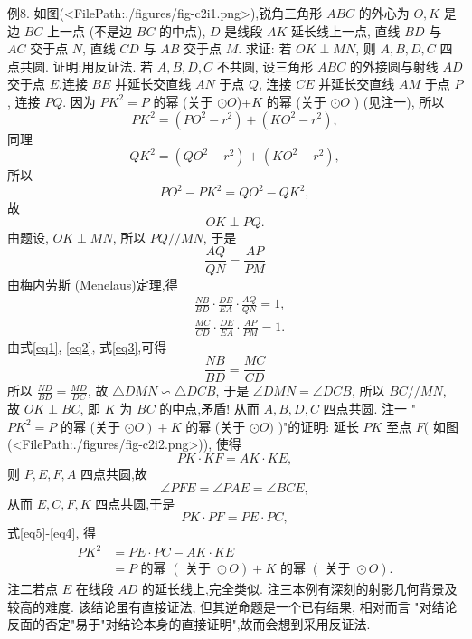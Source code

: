 例8. 如图(<FilePath:./figures/fig-c2i1.png>),锐角三角形 $A B C$ 的外心为 $O, K$ 是边 $B C$ 上一点 (不是边 $B C$ 的中点), $D$ 是线段 $A K$ 延长线上一点, 直线 $B D$ 与 $A C$ 交于点 $N$, 直线 $C D$ 与 $A B$ 交于点 $M$. 
求证: 若 $O K \perp M N$, 则 $A, B, D, C$ 四点共圆.
证明:用反证法.
若 $A, B, D, C$ 不共圆, 设三角形 $A B C$ 的外接圆与射线 $A D$ 交于点 $E$,连接 $B E$ 并延长交直线 $A N$ 于点 $Q$, 连接 $C E$ 并延长交直线 $A M$ 于点 $P$, 连接 $P Q$.
因为 $P K^2=P$ 的幂 (关于 $\odot O$)+$K$ 的幂 (关于 $\odot O$ ) (见注一), 所以
$$
P K^2=\left(P O^2-r^2\right)+\left(K O^2-r^2\right),
$$
同理
$$
Q K^2=\left(Q O^2-r^2\right)+\left(K O^2-r^2\right),
$$
所以
$$
P O^2-P K^2=Q O^2-Q K^2,
$$
故
$$
O K \perp P Q .
$$
由题设, $O K \perp M N$, 所以 $P Q / / M N$, 于是
$$
\frac{A Q}{Q N}=\frac{A P}{P M} \label{eq1}
$$
由梅内劳斯 (Menelaus)定理,得
$$
\begin{aligned}
& \frac{N B}{B D} \cdot \frac{D E}{E A} \cdot \frac{A Q}{Q N}=1, \label{eq2} \\
& \frac{M C}{C D} \cdot \frac{D E}{E A} \cdot \frac{A P}{P M}=1 . \label{eq3}
\end{aligned}
$$
由式\ref{eq1}, \ref{eq2}, 式\ref{eq3},可得
$$
\frac{N B}{B D}=\frac{M C}{C D}
$$
所以 $\frac{N D}{B D}=\frac{M D}{D C}$, 故 $\triangle D M N \backsim \triangle D C B$, 于是 $\angle D M N=\angle D C B$, 所以 $B C / / M N$, 故 $O K \perp B C$, 即 $K$ 为 $B C$ 的中点,矛盾! 从而 $A, B, D, C$ 四点共圆.
注一 " $P K^2=P$ 的幂 (关于 $\left.\odot O\right)+K$ 的幂 (关于 $\odot O)$ )"的证明: 延长 $P K$ 至点 $F$( 如图(<FilePath:./figures/fig-c2i2.png>)), 使得
$$
P K \cdot K F=A K \cdot K E, \label{eq4}
$$
则 $P, E, F, A$ 四点共圆,故
$$
\angle P F E=\angle P A E=\angle B C E,
$$
从而 $E, C, F, K$ 四点共圆,于是
$$
P K \cdot P F=P E \cdot P C, \label{eq5}
$$
式\ref{eq5}-\ref{eq4}, 得
$$
\begin{aligned}
P K^2 & =P E \cdot P C-A K \cdot K E \\
& =P \text { 的幂 }(\text { 关于 } \odot O)+K \text { 的幂 }(\text { 关于 } \odot O) .
\end{aligned}
$$
注二若点 $E$ 在线段 $A D$ 的延长线上,完全类似.
注三本例有深刻的射影几何背景及较高的难度.
该结论虽有直接证法, 但其逆命题是一个已有结果, 相对而言 "对结论反面的否定"易于"对结论本身的直接证明",故而会想到采用反证法.




